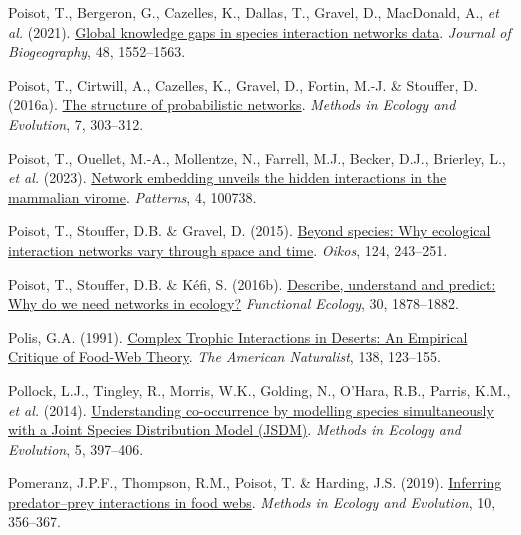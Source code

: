 \documentclass[
]{article}
\newlength{\cslhangindent}
\newenvironment{CSLReferences}[2] %
 {\begin{list}{}{%
  \setlength{\itemindent}{0pt}
  \setlength{\leftmargin}{0pt}
  \setlength{\parsep}{0pt}
  \ifodd #1
   \setlength{\leftmargin}{\cslhangindent}
   \setlength{\itemindent}{-1\cslhangindent}
  \fi
  \setlength{\itemsep}{#2\baselineskip}}}
 {\end{list}}
\begin{document}
\begin{CSLReferences}{1}{0}
Poisot, T., Bergeron, G., Cazelles, K., Dallas, T., Gravel, D.,
MacDonald, A., \emph{et al.} (2021).
\href{https://doi.org/10.1111/jbi.14127}{Global knowledge gaps in
species interaction networks data}. \emph{Journal of Biogeography}, 48,
1552--1563.

Poisot, T., Cirtwill, A., Cazelles, K., Gravel, D., Fortin, M.-J. \&
Stouffer, D. (2016a). \href{https://doi.org/10}{The structure of
probabilistic networks}. \emph{Methods in Ecology and Evolution}, 7,
303--312.

Poisot, T., Ouellet, M.-A., Mollentze, N., Farrell, M.J., Becker, D.J.,
Brierley, L., \emph{et al.} (2023).
\href{https://doi.org/10.1016/j.patter.2023.100738}{Network embedding
unveils the hidden interactions in the mammalian virome}.
\emph{Patterns}, 4, 100738.

Poisot, T., Stouffer, D.B. \& Gravel, D. (2015).
\href{https://doi.org/10.1111/oik.01719}{Beyond species: Why ecological
interaction networks vary through space and time}. \emph{Oikos}, 124,
243--251.

Poisot, T., Stouffer, D.B. \& Kéfi, S. (2016b).
\href{https://www.jstor.org/stable/48582345}{Describe, understand and
predict: Why do we need networks in ecology?} \emph{Functional Ecology},
30, 1878--1882.

Polis, G.A. (1991). \href{https://www.jstor.org/stable/2462536}{Complex
{Trophic Interactions} in {Deserts}: {An Empirical Critique} of
{Food-Web Theory}}. \emph{The American Naturalist}, 138, 123--155.

Pollock, L.J., Tingley, R., Morris, W.K., Golding, N., O'Hara, R.B.,
Parris, K.M., \emph{et al.} (2014).
\href{https://doi.org/10.1111/2041-210X.12180}{Understanding
co-occurrence by modelling species simultaneously with a {Joint Species
Distribution Model} ({JSDM})}. \emph{Methods in Ecology and Evolution},
5, 397--406.

Pomeranz, J.P.F., Thompson, R.M., Poisot, T. \& Harding, J.S. (2019).
\href{https://doi.org/10.1111/2041-210X.13125}{Inferring predator--prey
interactions in food webs}. \emph{Methods in Ecology and Evolution}, 10,
356--367.


\end{CSLReferences}
\end{document}
